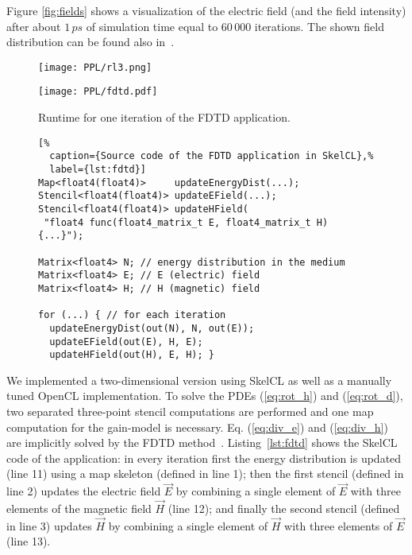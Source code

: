 Figure \ref{fig:fields} shows a visualization of the electric field (and the field intensity) after about  $1\,ps$ of simulation time equal to $60\,000$ iterations.
The shown field distribution can be found also in~\cite{Cao2000, Sebbah2002, Yamilov2005}.%

\begin{figure}[t]
	\begin{minipage}[b]{.48\textwidth}
    \centering
	  \texttt{[image: PPL/rl3.png]}
  	\caption{\small The image shows a 3D representation of the intensity for the 2D electric field as computed by the SkelCL FDTD implementation after $60\,000$ iterations.}
	  \label{fig:fields}
  \end{minipage}
  \hspace{.02\textwidth}
  \begin{minipage}[b]{.48\textwidth}
    \centering
	  \texttt{[image: PPL/fdtd.pdf]}
  	\caption{\small Runtime for one iteration of the FDTD application.}
  	\label{fig:fdtd_eval}
  \end{minipage}
  \bigskip
\end{figure}

\begin{figure}[tbp]
\begin{lstlisting}[%
  caption={Source code of the FDTD application in SkelCL},%
  label={lst:fdtd}]
Map<float4(float4)>     updateEnergyDist(...);
Stencil<float4(float4)> updateEField(...);
Stencil<float4(float4)> updateHField(
 "float4 func(float4_matrix_t E, float4_matrix_t H) {...}");

Matrix<float4> N; // energy distribution in the medium
Matrix<float4> E; // E (electric) field
Matrix<float4> H; // H (magnetic) field

for (...) { // for each iteration
  updateEnergyDist(out(N), N, out(E));  
  updateEField(out(E), H, E);
  updateHField(out(H), E, H); }
\end{lstlisting}
\end{figure}

We implemented a two-dimensional version using SkelCL as well as a manually tuned OpenCL implementation.
To solve the PDEs (\ref{eq:rot_h}) and (\ref{eq:rot_d}), two separated three-point stencil computations are performed and one map computation for the gain-model is necessary.
Eq. (\ref{eq:div_e}) and (\ref{eq:div_h}) are implicitly solved by the FDTD method~\cite{Yee1966}.
Listing~\ref{lst:fdtd} shows the SkelCL code of the application:
in every iteration first the energy distribution is updated (line 11) using a map skeleton (defined in line 1);
then the first stencil (defined in line 2) updates the electric field $\vec{E}$ by combining a single element of $\vec{E}$ with three elements of the magnetic field $\vec{H}$ (line 12);
and finally the second stencil (defined in line 3) updates $\vec{H}$ by combining a single element of $\vec{H}$ with three elements of $\vec{E}$ (line 13).

